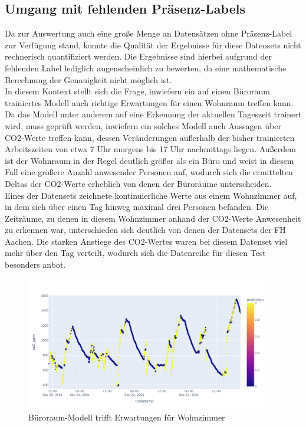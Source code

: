 \newpage

\subsection{Umgang mit fehlenden Präsenz-Labels}
Da zur Auswertung auch eine große Menge an Datensätzen ohne Präsenz-Label zur Verfügung stand, konnte die 
Qualität der Ergebnisse für diese Datensets nicht rechnerisch quantifiziert werden. Die Ergebnisse
sind hierbei aufgrund der fehlenden Label lediglich augenscheinlich zu bewerten, da eine mathematische
Berechnung der Genauigkeit nicht möglich ist.\\
In diesem Kontext stellt sich die Frage, inwiefern ein auf einen Büroraum trainiertes Modell auch richtige
Erwartungen für einen Wohnraum treffen kann.
Da das Modell unter anderem auf eine Erkennung der aktuellen Tageszeit trainert wird, muss geprüft
werden, inwiefern ein solches Modell auch Aussagen über CO2-Werte treffen kann, dessen Veränderungen außerhalb
der bisher trainierten Arbeitszeiten von etwa 7 Uhr morgens bis 17 Uhr nachmittags liegen. 
Außerdem ist der Wohnraum in der Regel deutlich größer als ein Büro und weist in diesem Fall eine größere Anzahl 
anwesender Personen auf, wodurch sich die ermittelten Deltas der CO2-Werte erheblich von denen der Büroräume 
unterscheiden.\\
Eines der Datensets zeichnete kontinuierliche Werte aus einem Wohnzimmer auf, in dem sich über einen 
Tag hinweg maximal drei Personen befanden. Die Zeiträume, zu denen in diesem Wohnzimmer anhand der CO2-Werte
Anwesenheit zu erkennen war, unterschieden sich deutlich von denen der Datensets der FH Aachen. Die 
starken Anstiege des CO2-Wertes waren bei diesem Datenset viel mehr über den Tag verteilt, wodurch sich die 
Datenreihe für diesen Test besonders anbot.

\begin{figure}[h]
    \centering
    \includegraphics[width=0.95\textwidth]{pic/h217_predicting_livingroom.png}
    \caption{Büroraum-Modell trifft Erwartungen für Wohnzimmer}
    \label{fig:pred_livingroom}
\end{figure}


